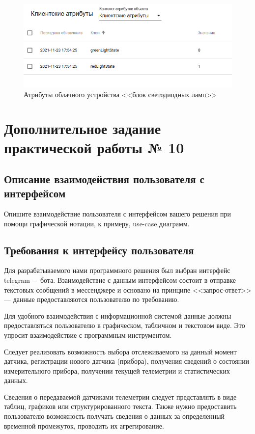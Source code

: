 \documentclass[utf8x]{G7-32} %
\begin{document}
\begin{figure}[h!]
	\centering
	\includegraphics[width=0.6\linewidth]{images/attr-2}
	\caption{Атрибуты облачного устройства <<блок светодиодных ламп>>}
	\label{fig:attr-2}
\end{figure}


\section{Дополнительное задание практической работы № 10}

\subsection*{Описание взаимодействия пользователя с интерфейсом}
Опишите взаимодействие пользователя с интерфейсом вашего решения при
помощи графической нотации, к примеру, use-case диаграмм. 

\subsection{Требования к интерфейсу пользователя}

Для разрабатываемого нами программного решения был выбран интерфейс telegram~--~бота. Взаимодействие с данным интерфейсом состоит в отправке текстовых сообщений в мессенджере и основано на принципе <<запрос-ответ>> --- данные предоставляются пользователю по требованию.

Для удобного взаимодействия с информационной системой данные должны предоставляться пользователю в графическом, табличном и текстовом виде. Это упросит взаимодействие с программным инструментом.


Следует реализовать возможность выбора отслеживаемого на данный момент датчика, регистрации нового датчика (прибора), получения сведений о состоянии измерительного прибора, получении текущей телеметрии и статистических данных.

Сведения о передаваемой датчиками телеметрии следует представлять в виде таблиц, графиков или структурированного текста. Также нужно предоставить пользователю возможность получать сведения о данных за определенный временной промежуток, проводить их агрегирование.
\end{document}
